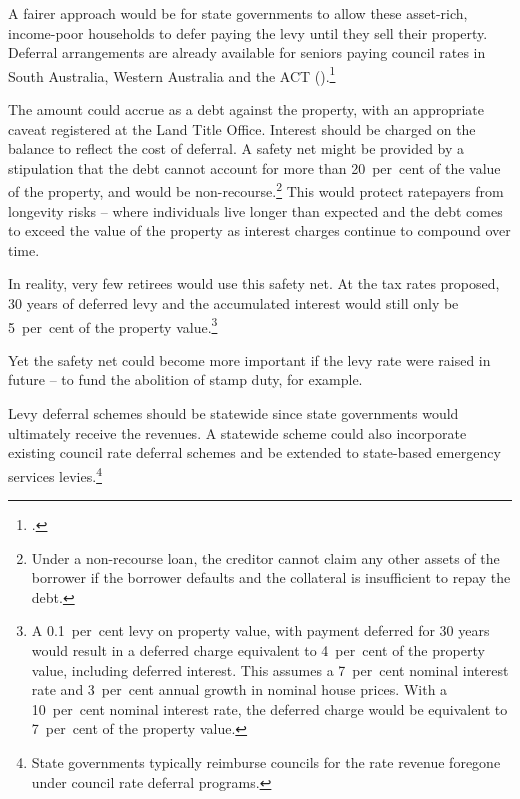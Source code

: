 \documentclass[twoside,english]{Dianab5ona4portrait}
\begin{document}
A fairer approach would be for state governments to allow these asset-rich, income-poor households to defer paying the levy until they sell their property. Deferral arrangements are already available for seniors paying council rates in South Australia, Western Australia and the ACT ().\footcite{Brownfield2014} 

The amount could accrue as a debt against the property, with an appropriate caveat registered at the Land Title Office. Interest should be charged on the balance to reflect the cost of deferral. A safety net might be provided by a stipulation that the debt cannot account for more than 20~per~cent of the value of the property, and would be non-recourse.\footnote{Under a non-recourse loan, the creditor cannot claim any other assets of the borrower if the borrower defaults and the collateral is insufficient to repay the debt.}  This would protect ratepayers from longevity risks – where individuals live longer than expected and the debt comes to exceed the value of the property as interest charges continue to compound over time. 

In reality, very few retirees would use this safety net. At the tax rates proposed, 30 years of deferred levy and the accumulated interest would still only be 5~per~cent of the property value.\footnote{A 0.1~per~cent levy on property value, with payment deferred for 30 years would result in a deferred charge equivalent to 4~per~cent of the property value, including deferred interest. This assumes a 7~per~cent nominal interest rate and 3~per~cent annual growth in nominal house prices. With a 10~per~cent nominal interest rate, the deferred charge would be equivalent to 7~per~cent of the property value.}  

Yet the safety net could become more important if the levy rate were raised in future -- to fund the abolition of stamp duty, for example. 

Levy deferral schemes should be statewide since state governments would ultimately receive the revenues. A statewide scheme could also incorporate existing council rate deferral schemes and be extended to state-based emergency services levies.\footnote{State governments typically reimburse councils for the rate revenue foregone under council rate deferral programs.} 
\end{document}

